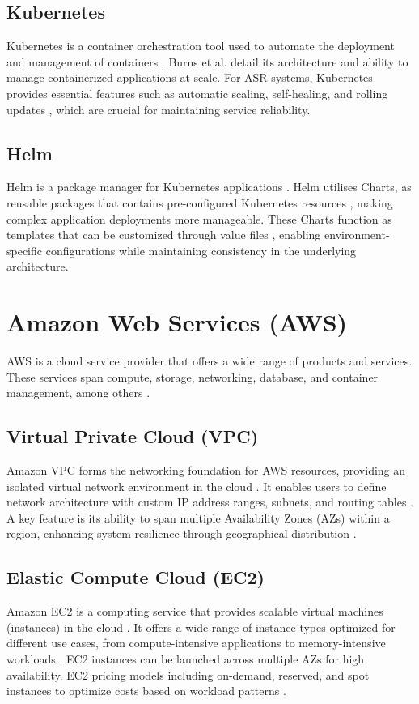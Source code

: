 \subsection{Kubernetes}
Kubernetes is a container orchestration tool used to automate the deployment and management of containers \cite{k8s_definition}. Burns et al. \cite{k8s_architecture} detail its architecture and ability to manage containerized applications at scale. For ASR systems, Kubernetes provides essential features such as automatic scaling, self-healing, and rolling updates \cite{k8s_features}, which are crucial for maintaining service reliability.

\subsection{Helm}
Helm is a package manager for Kubernetes applications \cite{helm_definition}. Helm utilises Charts, as reusable packages that contains pre-configured Kubernetes resources \cite{helm_charts}, making complex application deployments more manageable. These Charts function as templates that can be customized through value files \cite{helm_definition}, enabling environment-specific configurations while maintaining consistency in the underlying architecture.

\section{Amazon Web Services (AWS)}
AWS is a cloud service provider that offers a wide range of products and services. These services span compute, storage, networking, database, and container management, among others \cite{aws_definition}.

\subsection{Virtual Private Cloud (VPC)}
Amazon VPC forms the networking foundation for AWS resources, providing an isolated virtual network environment in the cloud \cite{vpc}. It enables users to define network architecture with custom IP address ranges, subnets, and routing tables \cite{vpc}. A key feature is its ability to span multiple Availability Zones (AZs) within a region, enhancing system resilience through geographical distribution \cite{vpc_az}.

\subsection{Elastic Compute Cloud (EC2)}
Amazon EC2 is a computing service that provides scalable virtual machines (instances) in the cloud \cite{ec2_definition}. It offers a wide range of instance types optimized for different use cases, from compute-intensive applications to memory-intensive workloads \cite{ec2_instance_types}. EC2 instances can be launched across multiple AZs for high availability. EC2 pricing models including on-demand, reserved, and spot instances to optimize costs based on workload patterns \cite{ec2_pricing}.

